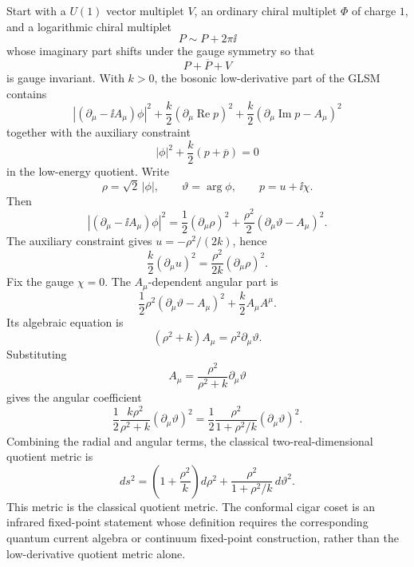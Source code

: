 Start with a \(U(1)\) vector multiplet \(V\), an ordinary chiral multiplet
\(\Phi\) of charge \(1\), and a logarithmic chiral multiplet
\[
  P\sim P+2\pi\ii
\]
whose imaginary part shifts under the gauge symmetry so that
\[
  P+\overline P+V
\]
is gauge invariant.  With \(k>0\), the bosonic low-derivative part of the
GLSM contains
\begin{equation}
  |(\partial_\mu-\ii A_\mu)\phi|^2
  +
  \frac{k}{2}(\partial_\mu\operatorname{Re}p)^2
  +
  \frac{k}{2}
  (\partial_\mu\operatorname{Im}p-A_\mu)^2
  \label{eq:cigar-glsm-bosonic-kinetic}
\end{equation}
together with the auxiliary constraint
\[
  |\phi|^2+\frac{k}{2}(p+\overline p)=0
\]
in the low-energy quotient.  Write
\[
  \rho=\sqrt2\,|\phi|,\qquad \vartheta=\arg\phi,\qquad
  p=u+\ii\chi .
\]
Then
\[
  |(\partial_\mu-\ii A_\mu)\phi|^2
  =
  \frac12(\partial_\mu\rho)^2
  +
  \frac{\rho^2}{2}(\partial_\mu\vartheta-A_\mu)^2 .
\]
The auxiliary constraint gives \(u=-\rho^2/(2k)\), hence
\[
  \frac{k}{2}(\partial_\mu u)^2
  =
  \frac{\rho^2}{2k}(\partial_\mu\rho)^2 .
\]
Fix the gauge \(\chi=0\).  The \(A_\mu\)-dependent angular part is
\[
  \frac12\rho^2(\partial_\mu\vartheta-A_\mu)^2
  +
  \frac{k}{2}A_\mu A^\mu .
\]
Its algebraic equation is
\begin{equation}
  (\rho^2+k)A_\mu=\rho^2\partial_\mu\vartheta .
  \label{eq:cigar-glsm-gauge-field-saddle}
\end{equation}
Substituting
\[
  A_\mu=\frac{\rho^2}{\rho^2+k}\partial_\mu\vartheta
\]
gives the angular coefficient
\[
  \frac12
  \frac{k\rho^2}{\rho^2+k}
  (\partial_\mu\vartheta)^2
  =
  \frac12
  \frac{\rho^2}{1+\rho^2/k}
  (\partial_\mu\vartheta)^2 .
\]
Combining the radial and angular terms, the classical two-real-dimensional
quotient metric is
\begin{equation}
  ds^2
  =
  \left(1+\frac{\rho^2}{k}\right)d\rho^2
  +
  \frac{\rho^2}{1+\rho^2/k}\,d\vartheta^2 .
  \label{eq:cigar-glsm-classical-quotient-metric}
\end{equation}
This metric is the classical quotient metric.  The conformal cigar coset is
an infrared fixed-point statement whose definition requires the corresponding
quantum current algebra or continuum fixed-point construction, rather than
the low-derivative quotient metric alone.

